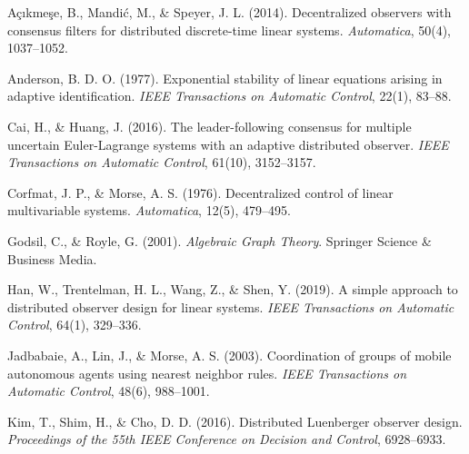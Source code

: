 \documentclass[twocolumn]{autart}
\begin{document}
\begin{thebibliography}{99}


A\c{c}{\i}kme\c{s}e, B., Mandi\'{c}, M., \&  Speyer,  J. L. (2014).
\newblock  Decentralized observers with consensus filters for distributed discrete-time linear systems.
\newblock  \emph{Automatica}, 50(4), 1037--1052.



Anderson, B. D. O. (1977).
\newblock Exponential stability of linear equations arising in adaptive identification.
\newblock \emph{IEEE Transactions on Automatic Control}, 22(1), 83--88.



Cai, H., \& Huang, J. (2016).
\newblock The leader-following consensus for multiple uncertain Euler-Lagrange systems with an adaptive distributed observer.
\newblock \emph{IEEE Transactions on Automatic Control}, 61(10), 3152--3157.



Corfmat, J. P., \& Morse, A. S. (1976).
\newblock Decentralized control of linear multivariable systems.
\newblock \emph{Automatica}, 12(5), 479--495.



Godsil, C., \& Royle, G.  (2001).
\newblock  \emph{Algebraic Graph Theory}.
\newblock Springer Science \& Business Media.


%

Han, W., Trentelman, H. L., Wang,  Z., \&  Shen, Y. (2019).
\newblock A simple approach to distributed observer design for linear systems.
\newblock \emph{IEEE Transactions on Automatic Control}, 64(1), 329--336.




Jadbabaie, A.,  Lin, J., \&  Morse, A. S. (2003).
\newblock Coordination of groups of mobile autonomous agents using nearest neighbor rules.
\newblock \emph{IEEE Transactions on Automatic Control}, 48(6), 988--1001.



Kim, T., Shim, H., \&  Cho, D. D. (2016).
\newblock Distributed Luenberger observer design.
\newblock \emph{Proceedings of the 55th IEEE Conference on Decision and Control}, 6928--6933.




\end{thebibliography}
\end{document}
